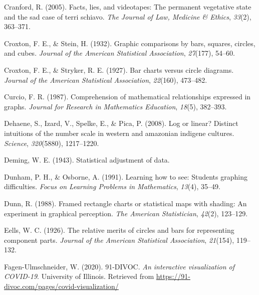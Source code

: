 \documentclass[print]{nuthesis}
\newlength{\cslhangindent}
\newenvironment{CSLReferences}[2]%
{\setlength{\parindent}{0pt}%
\everypar{\setlength{\hangindent}{\cslhangindent}}\ignorespaces}%
{\par}
\begin{document}
\begin{CSLReferences}{1}{0}
\leavevmode{}%
Cranford, R. (2005). Facts, lies, and videotapes: The permanent vegetative state and the sad case of terri schiavo. \emph{The Journal of Law, Medicine \& Ethics}, \emph{33}(2), 363--371.

\leavevmode{}%
Croxton, F. E., \& Stein, H. (1932). Graphic comparisons by bars, squares, circles, and cubes. \emph{Journal of the American Statistical Association}, \emph{27}(177), 54--60.

\leavevmode{}%
Croxton, F. E., \& Stryker, R. E. (1927). Bar charts versus circle diagrams. \emph{Journal of the American Statistical Association}, \emph{22}(160), 473--482.

\leavevmode{}%
Curcio, F. R. (1987). Comprehension of mathematical relationships expressed in graphs. \emph{Journal for Research in Mathematics Education}, \emph{18}(5), 382--393.

\leavevmode{}%
Dehaene, S., Izard, V., Spelke, E., \& Pica, P. (2008). Log or linear? Distinct intuitions of the number scale in western and amazonian indigene cultures. \emph{Science}, \emph{320}(5880), 1217--1220.

\leavevmode{}%
Deming, W. E. (1943). Statistical adjustment of data.

\leavevmode{}%
Dunham, P. H., \& Osborne, A. (1991). Learning how to see: Students graphing difficulties. \emph{Focus on Learning Problems in Mathematics}, \emph{13}(4), 35--49.

\leavevmode{}%
Dunn, R. (1988). Framed rectangle charts or statistical maps with shading: An experiment in graphical perception. \emph{The American Statistician}, \emph{42}(2), 123--129.

\leavevmode{}%
Eells, W. C. (1926). The relative merits of circles and bars for representing component parts. \emph{Journal of the American Statistical Association}, \emph{21}(154), 119--132.

\leavevmode{}%
Fagen-Ulmschneider, W. (2020). 91-DIVOC. \emph{An interactive visualization of COVID-19}. University of Illinois. Retrieved from \url{https://91-divoc.com/pages/covid-visualization/}


\end{CSLReferences}
\end{document}
